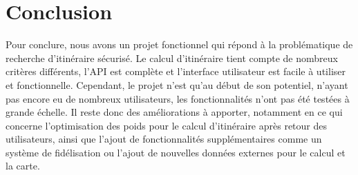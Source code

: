 \documentclass[11pt,a4paper]{article}
\begin{document}
\section*{Conclusion}
\noindent Pour conclure, nous avons un projet fonctionnel qui répond à la problématique de recherche d'itinéraire sécurisé. Le calcul d'itinéraire tient compte de nombreux critères différents, l'API est complète et l'interface utilisateur est facile à utiliser et fonctionnelle. Cependant, le projet n'est qu'au début de son potentiel, n'ayant pas encore eu de nombreux utilisateurs, les fonctionnalités n'ont pas été testées à grande échelle. Il reste donc des améliorations à apporter, notamment en ce qui concerne l'optimisation des poids pour le calcul d'itinéraire après retour des utilisateurs, ainsi que l'ajout de fonctionnalités supplémentaires comme un système de fidélisation ou l'ajout de nouvelles données externes pour le calcul et la carte.

\newpage


\end{document}
